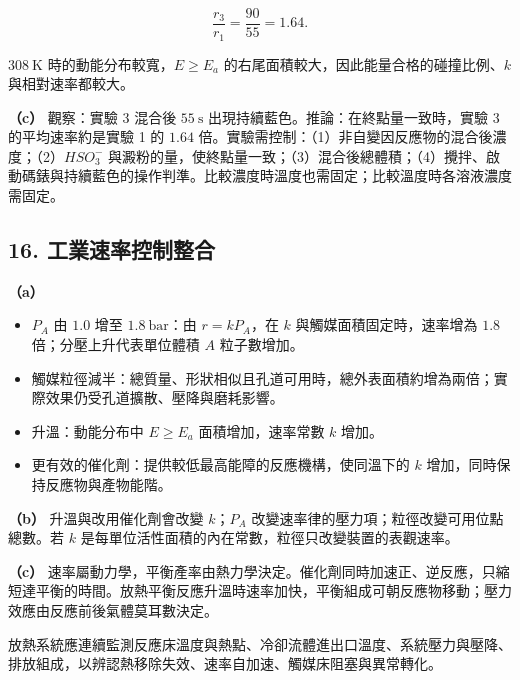 \documentclass[11pt,a4paper]{article}
\providecommand{\tightlist}{%
  \setlength{\itemsep}{0pt}\setlength{\parskip}{0pt}}
\begin{document}
\[
\frac{r_3}{r_1}=\frac{90}{55}=1.64.
\]

\(308\ \mathrm K\) 時的動能分布較寬，\(E\ge E_a\) 的右尾面積較大，因此能量合格的碰撞比例、\(k\) 與相對速率都較大。

\textbf{（c）} 觀察：實驗 3 混合後 \(55\ \mathrm s\) 出現持續藍色。推論：在終點量一致時，實驗 3 的平均速率約是實驗 1 的 \(1.64\) 倍。實驗需控制：（1）非自變因反應物的混合後濃度；（2）\(HSO_3^-\) 與澱粉的量，使終點量一致；（3）混合後總體積；（4）攪拌、啟動碼錶與持續藍色的操作判準。比較濃度時溫度也需固定；比較溫度時各溶液濃度需固定。

\subsection{16. 工業速率控制整合}\label{ux5de5ux696dux901fux7387ux63a7ux5236ux6574ux5408}

\textbf{（a）}

\begin{itemize}
\tightlist
\item
  \(P_A\) 由 \(1.0\) 增至 \(1.8\ \mathrm{bar}\)：由 \(r=kP_A\)，在 \(k\) 與觸媒面積固定時，速率增為 \(1.8\) 倍；分壓上升代表單位體積 \(A\) 粒子數增加。
\item
  觸媒粒徑減半：總質量、形狀相似且孔道可用時，總外表面積約增為兩倍；實際效果仍受孔道擴散、壓降與磨耗影響。
\item
  升溫：動能分布中 \(E\ge E_a\) 面積增加，速率常數 \(k\) 增加。
\item
  更有效的催化劑：提供較低最高能障的反應機構，使同溫下的 \(k\) 增加，同時保持反應物與產物能階。
\end{itemize}

\textbf{（b）} 升溫與改用催化劑會改變 \(k\)；\(P_A\) 改變速率律的壓力項；粒徑改變可用位點總數。若 \(k\) 是每單位活性面積的內在常數，粒徑只改變裝置的表觀速率。

\textbf{（c）} 速率屬動力學，平衡產率由熱力學決定。催化劑同時加速正、逆反應，只縮短達平衡的時間。放熱平衡反應升溫時速率加快，平衡組成可朝反應物移動；壓力效應由反應前後氣體莫耳數決定。

放熱系統應連續監測反應床溫度與熱點、冷卻流體進出口溫度、系統壓力與壓降、排放組成，以辨認熱移除失效、速率自加速、觸媒床阻塞與異常轉化。
\end{document}
